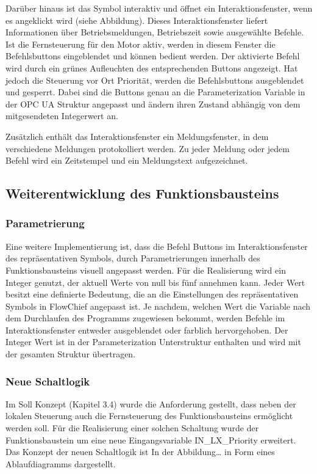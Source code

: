 Darüber hinaus ist das Symbol interaktiv und öffnet ein Interaktionsfenster, wenn es angeklickt wird (siehe Abbildung). Dieses Interaktionsfenster liefert Informationen über Betriebsmeldungen, Betriebszeit sowie ausgewählte Befehle. Ist die Fernsteuerung für den Motor aktiv, werden in diesem Fenster die Befehlsbuttons eingeblendet und können bedient werden. Der aktivierte Befehl wird durch ein grünes Aufleuchten des entsprechenden Buttons angezeigt. Hat jedoch die Steuerung vor Ort Priorität, werden die Befehlsbuttons ausgeblendet und gesperrt. Dabei sind die Buttons genau an die Parameterization Variable in der OPC UA Struktur angepasst und ändern ihren Zustand abhängig von dem mitgesendeten Integerwert an. 

Zusätzlich enthält das Interaktionsfenster ein Meldungsfenster, in dem verschiedene Meldungen protokolliert werden. Zu jeder Meldung oder jedem Befehl wird ein Zeitstempel und ein Meldungstext aufgezeichnet.

\subsection{Weiterentwicklung des Funktionsbausteins}

\subsubsection{Parametrierung}
Eine weitere Implementierung ist, dass die Befehl Buttons im Interaktionsfenster des repräsentativen Symbols, durch Parametrierungen innerhalb des Funktionsbausteins visuell angepasst werden. Für die Realisierung wird ein Integer genutzt, der aktuell Werte von null bis fünf annehmen kann. Jeder Wert besitzt eine definierte Bedeutung, die an die Einstellungen des repräsentativen Symbols in FlowChief angepasst ist. Je nachdem, welchen Wert die Variable nach dem Durchlaufen des Programms zugewiesen bekommt, werden Befehle im Interaktionsfenster entweder ausgeblendet oder farblich hervorgehoben. Der Integer Wert ist in der Parameterization Unterstruktur enthalten und wird mit der gesamten Struktur übertragen.

\subsubsection{Neue Schaltlogik}
Im Soll Konzept (Kapitel 3.4) wurde die Anforderung gestellt, dass neben der lokalen Steuerung auch die Fernsteuerung des Funktionsbausteins ermöglicht werden soll. Für die Realisierung einer solchen Schaltung wurde der Funktionsbaustein um eine neue Eingangsvariable IN_LX_Priority erweitert. Das Konzept der neuen Schaltlogik ist In der Abbildung… in Form eines Ablaufdiagramms dargestellt.

